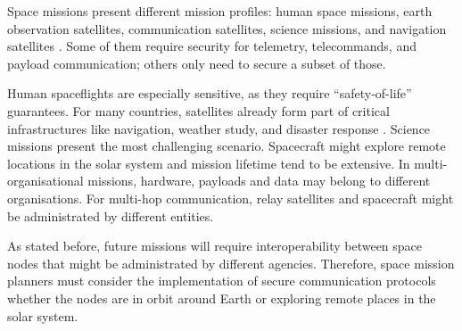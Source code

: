  


 
 
Space missions present different mission profiles: human space missions, earth observation satellites, communication satellites, science missions, and navigation satellites \cite{book2012architecture}. Some of them require security for telemetry, telecommands, and payload communication; others only need to secure a subset of those. 


Human spaceflights are especially sensitive, as they require ``safety-of-life'' guarantees. For many countries, satellites already form part of critical infrastructures like navigation, weather study, and disaster response \cite{book2006security}. Science missions present the most challenging scenario. Spacecraft might explore remote locations in the solar system and mission lifetime tend to be extensive. In multi-organisational missions, hardware, payloads and data may belong to different organisations. For multi-hop communication, relay satellites and spacecraft might be administrated by different entities.


As stated before, future missions will require interoperability between space nodes that might be administrated by different agencies. Therefore, space mission planners must consider the implementation of secure communication protocols whether the nodes are in orbit around Earth or exploring remote places in the solar system.


 
 
